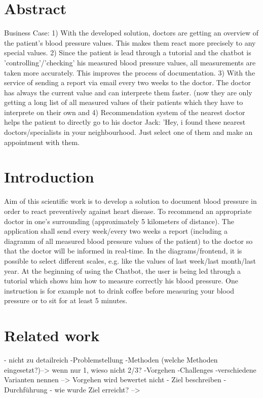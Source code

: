 




\chapter{Abstract}\label{abstract}

Business Case:
1) With the developed solution, doctors are getting an overview of the patient's blood pressure values. This makes them react more precisely to any special values. 
2) Since the patient is lead through a tutorial and the chatbot is 'controlling'/'checking' his measured blood pressure values, all measurements are taken more accurately. This improves the process of documentation.
3) With the service of sending a report via email every two weeks to the doctor. The doctor has always the current value and can interprete them faster. (now they are only getting a long list of all measured values of their patients which they have to interprete on their own and 
4) Recommendation system of the nearest doctor helps the patient to directly go to his doctor 
Jack: 'Hey, i found these nearest doctors/specialists in your neighbourhood. Just select one of them and make an appointment with them. 

\chapter{Introduction}\label{introduction}

Aim of this scientific work is to develop a solution to document blood pressure in order to react preventively against heart disease.
To recommend an appropriate doctor in one's surrounding (approximately 5 kilometers of distance).
The application shall send every week/every two weeks a report (including a diagramm of all measured blood pressure values of the patient) to the doctor so that the doctor will be informed in real-time. In the diagrams/frontend, it is possible to select different scales, e.g. like the values of last week/last month/last year. 
At the beginning of using the Chatbot, the user is being led through a tutorial which shows him how to measure correctly his blood pressure. One instruction is for example not to drink coffee before measuring your blood pressure or to sit for at least 5 minutes.

\chapter{Related work}\label{related}
- nicht zu detailreich
-Problemstellung
-Methoden (welche Methoden eingesetzt?)--> wenn nur 1, wieso nicht 2/3?
-Vorgehen
-Challenges
-verschiedene Varianten nennen
--> Vorgehen wird bewertet nicht 
- Ziel beschreiben
- Durchführung
- wie wurde Ziel erreicht? --> 

